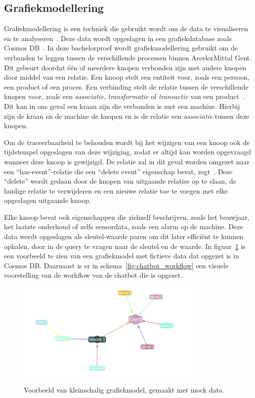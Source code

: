 \subsection{Grafiekmodellering}
Grafiekmodellering is een techniek die gebruikt wordt om de data te visualiseren en te analyseren~\autocite{neo4j20252}.
Deze data wordt opgeslagen in een grafiekdatabase zoals Cosmos DB~\autocite{Azure2024}. 
In deze bachelorproef wordt grafiekmodellering gebruikt om de verbanden te leggen tussen de verschillende processen binnen ArcelorMittal Gent.
Dit gebeurt doordat één of meerdere knopen verbonden zijn met andere knopen door middel van een relatie.
Een knoop stelt een entiteit voor, zoals een persoon, een product of een proces. 
Een verbinding stelt de relatie tussen de verschillende knopen voor, zoals een \emph{associatie}, \emph{transformatie} of \emph{transactie} van een product~\autocite{Byun2020}.
Dit kan in ons geval een kraan zijn die verbonden is met een machine. Hierbij zijn de kraan en de machine de knopen en is de relatie een \emph{associatie} tussen deze knopen.

Om de traceerbaarheid te behouden wordt bij het wijzigen van een knoop ook de tijdstempel opgeslagen van deze wijziging, zodat er altijd kan worden opgevraagd wanneer deze knoop is gewijzigd.
De relatie zal in dit geval worden omgezet naar een ``has-event''-relatie die een ``delete event'' eigenschap bevat, zegt~\autocite{Byun2020}.
Deze ``delete'' wordt gedaan door de knopen van uitgaande relaties op te slaan, de huidige relatie te verwijderen en een nieuwe relatie toe te voegen met elke opgeslagen uitgaande knoop.

Elke knoop bevat ook eigenschappen die zichzelf beschrijven, zoals het bouwjaar, het laatste onderhoud of zelfs sensordata, zoals een alarm op de machine.
Deze data wordt opgeslagen als sleutel-waarde paren om dit later efficiënt te kunnen ophalen, door in de query te vragen naar de sleutel en de waarde.
In figuur~\ref{fig:graphmodel} is een voorbeeld te zien van een grafiekmodel met fictieve data dat opgezet is in Cosmos DB.\@
Daarnaast is er in schema~\ref{fig:chatbot_workflow} een visuele voorstelling van de workflow van de chatbot die is opgezet.

\begin{figure}[H]
     \centering
     \includegraphics[width=0.8\textwidth]{./img/grapmodel_example.png}
     \caption[Voorbeeld Grafiekmodel.]{\label{fig:graphmodel}Voorbeeld van kleinschalig grafiekmodel, gemaakt met mock data.}
\end{figure}

